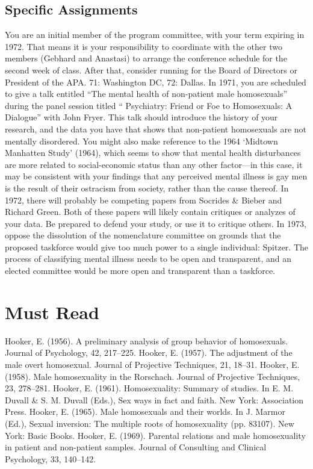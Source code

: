 \subsection{Specific Assignments}
\label{specificassignments}

You are an initial member of the program committee, with your term expiring in 1972. That means it is your responsibility to coordinate with the other two members (Gebhard and Anastasi) to arrange the conference schedule for the second week of class. After that, consider running for the Board of Directors or President of the APA. 71: Washington DC, 72: Dallas.
In 1971, you are scheduled to give a talk entitled “The mental health of non-patient male homosexuals” during the panel session titled “ Psychiatry: Friend or Foe to Homosexuals: A Dialogue” with John Fryer. This talk should introduce the history of your research, and the data you have that shows that non-patient homosexuals are not mentally disordered. You might also make reference to the 1964 ‘Midtown Manhatten Study’ (1964), which seems to show that mental health disturbances are more related to social-economic status than any other factor—in this case, it may be consistent with your findings that any perceived mental illness is gay men is the result of their ostracism from society, rather than the cause thereof.
In 1972, there will probably be competing papers from Socrides \& Bieber and Richard Green. Both of these papers will likely contain critiques or analyzes of your data. Be prepared to defend your study, or use it to critique others.
In 1973, oppose the dissolution of the nomenclature committee on grounds that the proposed taskforce would give too much power to a single individual: Spitzer. The process of classifying mental illness needs to be open and transparent, and an elected committee would be more open and transparent than a taskforce.

\section{Must Read}
\label{mustread}

Hooker, E. (1956). A preliminary analysis of group behavior of homosexuals. Journal of Psychology, 42, 217--225.
Hooker, E. (1957). The adjustment of the male overt homosexual. Journal of Projective Techniques, 21, 18--31.
Hooker, E. (1958). Male homosexuality in the Rorschach. Journal of Projective Techniques, 23, 278--281.
Hooker, E. (1961). Homosexuality: Summary of studies. In E. M. Duvall \& S. M. Duvall (Eds.), Sex ways in fact and faith. New York: Association Press.
Hooker, E. (1965). Male homosexuals and their worlds. In J. Marmor (Ed.), Sexual inversion: The multiple roots of homosexuality (pp. 83107). New York: Basic Books.
Hooker, E. (1969). Parental relations and male homosexuality in patient and non-patient samples. Journal of Consulting and Clinical Psychology, 33, 140--142.

